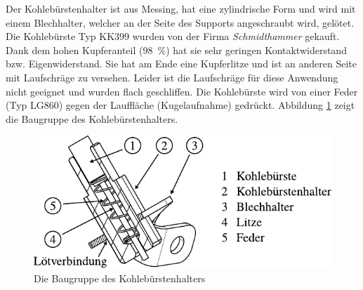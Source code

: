 Der Kohlebürstenhalter ist aus Messing, hat eine zylindrische Form und wird mit einem Blechhalter, welcher an der Seite des Supports angeschraubt wird, gelötet.
Die Kohlebürste Typ KK399 wurden von der Firma \textit{Schmidthammer} gekauft.
Dank dem hohen Kupferanteil (\SI{98}{\percent}) hat sie sehr geringen Kontaktwiderstand bzw. Eigenwiderstand.
Sie hat am Ende eine Kupferlitze und ist an anderen Seite mit Laufschräge zu versehen.
Leider ist die Laufschräge für diese Anwendung nicht geeignet und wurden flach geschliffen.
Die Kohlebürste wird von einer Feder (Typ LG860) gegen der Lauffläche (Kugelaufnahme) gedrückt.
Abbildung \ref{fig:die_baugruppe_des_kohlebuerstenhalters} zeigt die Baugruppe des Kohlebürstenhalters.
\begin{figure}[htb]
    \centering
    \includegraphics[]{./images/kohlebuerstenhalter_asm.pdf}
    \caption{Die Baugruppe des Kohlebürstenhalters}
    \label{fig:die_baugruppe_des_kohlebuerstenhalters}
\end{figure}
%

